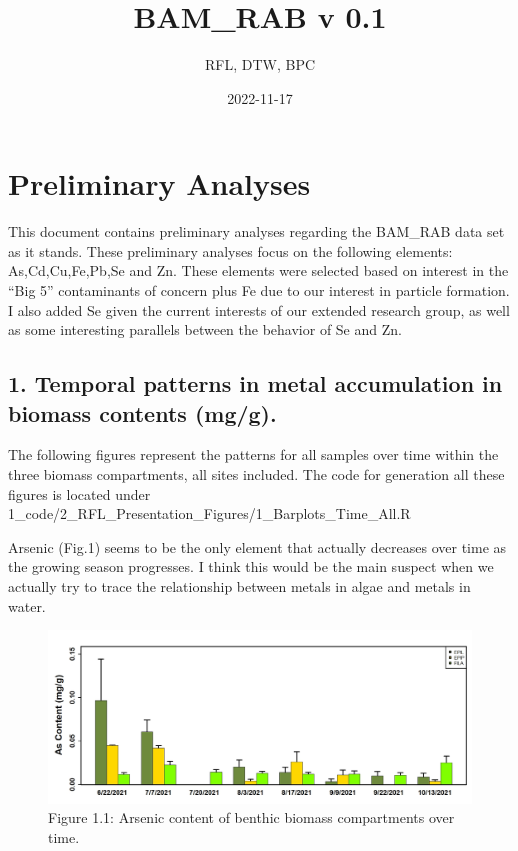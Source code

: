 \documentclass[
]{article}
\title{BAM\_RAB v 0.1}
\author{RFL, DTW, BPC}
\date{2022-11-17}
\begin{document}
\maketitle

\hypertarget{preliminary-analyses}{%
\section{Preliminary Analyses}\label{preliminary-analyses}}

This document contains preliminary analyses regarding the BAM\_RAB data
set as it stands. These preliminary analyses focus on the following
elements: As,Cd,Cu,Fe,Pb,Se and Zn. These elements were selected based
on interest in the ``Big 5'' contaminants of concern plus Fe due to our
interest in particle formation. I also added Se given the current
interests of our extended research group, as well as some interesting
parallels between the behavior of Se and Zn.

\hypertarget{temporal-patterns-in-metal-accumulation-in-biomass-contents-mgg.}{%
\subsection{1. Temporal patterns in metal accumulation in biomass
contents
(mg/g).}\label{temporal-patterns-in-metal-accumulation-in-biomass-contents-mgg.}}

The following figures represent the patterns for all samples over time
within the three biomass compartments, all sites included. The code for
generation all these figures is located under
1\_code/2\_RFL\_Presentation\_Figures/1\_Barplots\_Time\_All.R

Arsenic (Fig.1) seems to be the only element that actually decreases
over time as the growing season progresses. I think this would be the
main suspect when we actually try to trace the relationship between
metals in algae and metals in water.

\begin{figure}
\includegraphics[width=1\linewidth]{Figures/1} \caption[Figure 1.1]{Figure 1.1: Arsenic content of benthic biomass compartments over time.}\label{fig:unnamed-chunk-1}
\end{figure}
\end{document}
